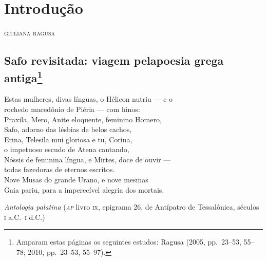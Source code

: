 \chapter[Introdução, \emph{por Giuliana Ragusa} \medskip]{Introdução}

\begin{flushright}
\textsc{giuliana ragusa}
\end{flushright}

\section*{Safo revisitada: viagem pela\break poesia grega
antiga\protect\footnote{\MakeUppercase{A}mparam estas páginas os seguintes estudos:
\MakeUppercase{R}agusa (2005, pp.~23--53, 55--78; 2010, pp.~23--53, 55--97).}}

\epigraph{Estas mulheres, divas línguas, o Hélicon nutriu --- e o  \\
rochedo macedônio de Piéria --- com hinos: \\
Praxila, Mero, Anite eloquente, feminino Homero, \\
Safo, adorno das lésbias de belos cachos, \\
Erina, Telesila mui gloriosa e tu, Corina, \\
o impetuoso escudo de Atena cantando, \\
Nóssis de feminina língua, e Mirtes, doce de ouvir ---  \\
todas fazedoras de eternos escritos. \\
Nove Musas do grande Urano, e nove mesmas \\
Gaia pariu, para a imperecível alegria dos mortais.}
{\textit{Antologia palatina} (\textit{\textsc{ap}} livro \textsc{ix}, epigrama 26, de Antípatro de Tessalônica,
séculos \textsc{i} a.C.--\textsc{i} d.C.)\footnotemark}


